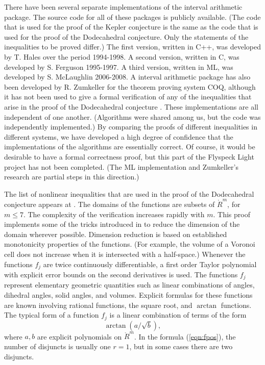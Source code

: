 There have been several separate implementations of the interval
arithmetic package.  
The source code for all of these packages
is publicly available. (The code that is used for the proof of 
the Kepler conjecture is the same as the code that is used for
the proof of the Dodecahedral conjecture.  Only the statements
of the inequalities to be proved differ.) 
The first version, written in C++, 
was developed by T. Hales
over the period 1994-1998.  
A second version, written in C, was developed by S. Ferguson 
1995-1997.  A third version, written in ML, was developed by S. McLaughlin 2006-2008.  A interval arithmetic package has also been developed
by R. Zumkeller for the theorem proving system COQ, although it has not  been used to give a formal verification of any of the inequalities that arise in the proof of the Dodecahedral conjecture \cite{Zu}.
These implementations are all independent of one another. (Algorithms
were shared among us, but the code was independently implemented.) 
By comparing the proofs of different inequalities in different 
systems, we have developed 
a high degree of confidence that the implementations
of the algorithms are essentially correct.  Of course, it would
be desirable to have a formal correctness proof, but this part
of the Flyspeck Light project has not been completed.  (The ML
implementation and Zumkeller's research are partial steps
in this direction.)

The list of nonlinear inequalities that are used in the
proof of the Dodecahedral conjecture appears at \cite{code}.
The domains of the functions are subsets of $\ring{R}^m$, for
$m\le 7$.  The complexity of the verification increases
rapidly with $m$.  This proof implements  some of the tricks introduced
in \cite{DCG} to reduce the dimension of the domain wherever
possible.  Dimension reduction is based on established
monotonicity properties of the functions.  (For example, the
volume of a Voronoi cell does not increase when it is intersected
with a half-space.)  Whenever the functions $f_j$ are twice continuously
differentiable,  a first order Taylor polynomial with
explicit error bounds on the second derivatives is used. 
The functions $f_j$ represent elementary geometric quantities such
as linear combinations of angles, dihedral angles, solid angles,
and volumes.  Explicit formulas for these functions are known
involving rational functions, the square root, and $\arctan$ functions.
The typical form of a function $f_j$ is a linear combination of terms
of the form
    $$
    \arctan(a/\sqrt{b}),
    $$
where $a,b$ are explicit polynomials on $\ring{R}^m$.
In the 
formula (\ref{eqn:fpos}), the number of disjuncts is usually one
$r=1$, but in some cases there are two disjuncts.

